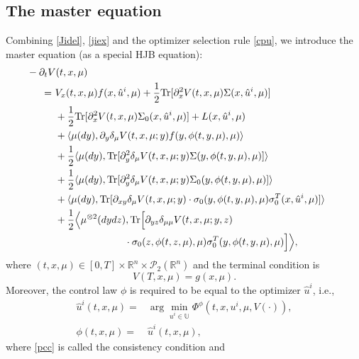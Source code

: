 \documentclass{amsart}
\theoremstyle{definition}
\theoremstyle{remark}
\def\cal{\mathcal}
\numberwithin{equation}{section}
\begin{document}
\subsection{The master equation}
Combining \eqref{Jidel}, \eqref{jiex} and the optimizer selection rule
\eqref{cpu}, we introduce the master equation (as a special HJB equation):
\begin{align*}
&\hskip -1cm - \partial_t V(t, x,\mu)\\
= \ &   V_x (t, x, \mu)
f(x, \hat u^i, \mu) + \frac{1}{2} {\rm Tr}
[\partial^2_{x} V(t, x, \mu) \Sigma  (x,\hat u^i,\mu  ) ] \\
&+ \frac{1}{2} {\rm Tr}
[\partial_{x}^2 V(t, x, \mu) \Sigma_0  (x,\hat u^i,\mu  ) ] + L(x, \hat u^i, \mu)\\
& + \langle\mu(dy),  \partial_y\delta_\mu V(t,x, \mu; y) f( y, \phi(t, y, \mu),\mu)\rangle  \\
&+\frac{1}{2}\langle \mu(dy), {\rm Tr}[
\partial_{y}^2 \delta_\mu
V(t, x, \mu; y) \Sigma(y,
\phi(t,y,\mu),\mu)]\rangle \\
& +\frac{1}{2}\langle \mu(dy), {\rm Tr}[
\partial_{y}^2 \delta_\mu
V(t, x, \mu; y) \Sigma_0(y, \phi(t,y,\mu),\mu)]\rangle \\
&+\langle\mu(dy) ,  {\rm Tr} [ \partial_{xy}\delta_\mu V(t,x, \mu;y) \cdot \sigma_0(y, \phi(t,y,\mu),\mu)\sigma_0^T(x,\hat u^i, \mu) ]\rangle  \\
&+\frac{1}{2}\Big\langle \mu^{\otimes 2}(dydz),  {\rm Tr}\Big[\partial_{yz}\delta_{\mu\mu} V (t, x, \mu; y,z)\\
&\qquad\qquad \quad\qquad\cdot
\sigma_0(z,\phi(t,z,\mu),\mu)\sigma^T_0(y,\phi(t,y,\mu),\mu)\Big]\Big\rangle ,
\end{align*}
where
 $(t,x,\mu)\in[0,T]\times \mathbb{R}^n\times
 {\cal P}_2(\mathbb{R}^n)  $ and the  terminal condition is
$$
V(T, x, \mu)=g(x, \mu).
$$
Moreover, the control law $\phi$ is required to be equal to  the
 optimizer $\hat u^i$, i.e.,
\begin{align}
\hat u^i(t,x,\mu)=&\arg \min_{u^i\in \mathbb{U}}\Phi^\phi(t, x, u^i,\mu,   V(\cdot) ), \\
  \phi (t, x, \mu)=& \hat u^i(t, x, \mu),   \label{pcc}
\end{align}
where \eqref{pcc} is called the consistency condition and
\end{document}
